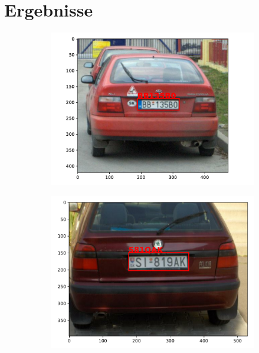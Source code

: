 \section{Ergebnisse}
\label{sec:ergebnisse}

\begin{figure}
    \centering
    \begin{subfigure}{0.35\textwidth}
        \includegraphics[width=\textwidth]{abbildungen/prediction_01.pdf}
    \end{subfigure}
    \begin{subfigure}{0.35\textwidth}
        \includegraphics[width=\textwidth]{abbildungen/prediction_02.pdf}
    \end{subfigure}

\end{figure}
